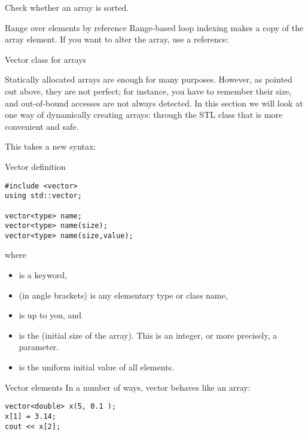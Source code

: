 \begin{exercise}
  \label{ex:array-sorted}
  Check whether an array is sorted.
\end{exercise}

\begin{block}{Range over elements by reference}
  \label{sl:array-range-ref}
  Range-based loop indexing makes a copy of the array element. If you
  want to alter the array, use a reference:
\end{block}

 {Vector class for arrays}
\label{sec:stdvector}

Statically allocated arrays are enough for many purposes. However, as
pointed out above, they are not perfect; for instance, you have to
remember their size, and out-of-bound accesses are not always
detected. In this section we
will look at one way of dynamically creating arrays: through the STL
 class that is more convenient and safe.

This takes a new syntax:

\begin{block}{Vector definition}
  \label{sl:vector-def}
\begin{verbatim}
#include <vector>
using std::vector;

vector<type> name;
vector<type> name(size);
vector<type> name(size,value);
\end{verbatim}
where
\begin{itemize}
\item {} is a keyword,
\item {} (in angle brackets) is any elementary type or class
  name,
\item {} is up to you, and
\item {} is the (initial size of the array). This is an integer,
  or more precisely, a  parameter.
\item {} is the uniform initial value of all elements.
\end{itemize}
\end{block}

\begin{block}{Vector elements}
  \label{sl:vectorsub}
  In a number of ways, vector behaves like an array:
\begin{verbatim}
vector<double> x(5, 0.1 );
x[1] = 3.14;
cout << x[2];
\end{verbatim}
\end{block}

